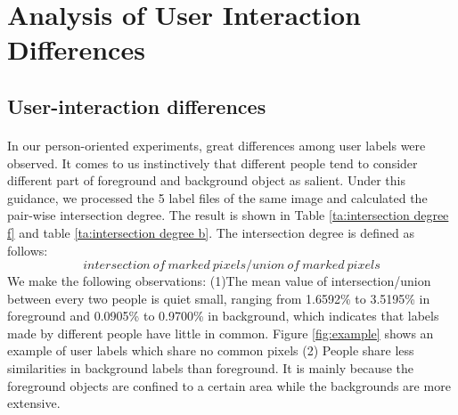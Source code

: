 \documentclass[runningheads,a4paper]{llncs}
\begin{document}
\section{Analysis of User Interaction Differences}

\subsection{User-interaction differences}
\paragraph{}In our person-oriented experiments, great differences among user labels were observed. It comes to us instinctively that different people tend to consider different part of foreground and background object as salient. Under this guidance, we processed the 5 label files of the same image and calculated the pair-wise intersection degree. The result is shown in Table \ref{ta:intersection degree f} and table \ref{ta:intersection degree b}. The intersection degree is defined as follows:
$$intersection\ of\ marked\ pixels/union\ of\ marked\ pixels$$
We make the following observations: (1)The mean value of intersection/union between every two people is quiet small, ranging from 1.6592\% to 3.5195\% in foreground and 0.0905\% to 0.9700\% in background, which indicates that labels made by different people have little in common. Figure \ref{fig:example} shows an example of user labels which share no common pixels (2) People share less similarities in background labels than foreground. It is mainly because the foreground objects are confined to a certain area while the backgrounds are more extensive.
\end{document}
